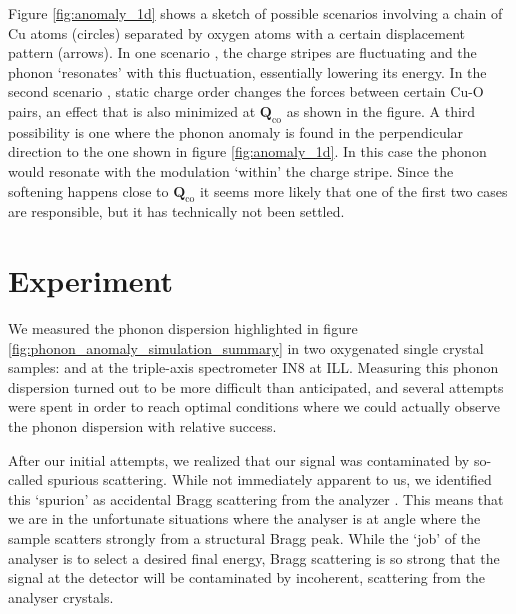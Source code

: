 Figure \ref{fig:anomaly_1d} shows a sketch of possible scenarios involving a chain of Cu atoms (circles) separated by oxygen atoms with a certain displacement pattern (arrows). In one scenario \cite{Kaneshita2002}, the charge stripes are fluctuating and the phonon `resonates' with this fluctuation, essentially lowering its energy. In the second scenario \cite{Reznik2006}, static charge order changes the forces between certain Cu-O pairs, an effect that is also minimized at $\bm{Q}_\text{co}$ as shown in the figure. A third possibility is one where the phonon anomaly is found in the perpendicular direction to the one shown in figure \ref{fig:anomaly_1d}. In this case the phonon would resonate with the modulation `within' the charge stripe. Since the softening happens close to $\bm{Q}_\text{co}$ it seems more likely that one of the first two cases are responsible, but it has technically not been settled.

\section{Experiment}
We measured the phonon dispersion highlighted in figure \ref{fig:phonon_anomaly_simulation_summary} in two oxygenated single crystal samples: \LCOO{} and \LSCOOsix{} at the triple-axis spectrometer IN8 at ILL. Measuring this phonon dispersion turned out to be more difficult than anticipated, and several attempts were spent in order to reach optimal conditions where we could actually observe the phonon dispersion with relative success.

After our initial attempts, we realized that our signal was contaminated by so-called spurious scattering. While not immediately apparent to us, we identified this `spurion' as accidental Bragg scattering from the analyzer \cite{Shirane2002}. This means that we are in the unfortunate situations where the analyser is at angle where the sample scatters strongly from a structural Bragg peak. While the `job' of the analyser is to select a desired final energy, Bragg scattering is so strong that the signal at the detector will be contaminated by incoherent, scattering from the analyser crystals.


